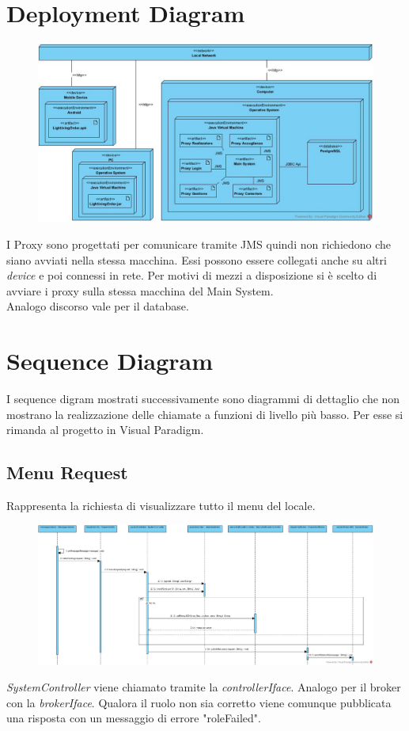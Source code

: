 \section{Deployment Diagram}
\begin{figure}[H]
	\centering
	\includegraphics[width=1\textwidth]{Immagini/deploy.jpg}
\end{figure}
I Proxy sono progettati per comunicare tramite JMS quindi non richiedono che siano avviati nella stessa macchina. Essi possono essere collegati anche su altri \textit{device} e poi connessi in rete. Per motivi di mezzi a disposizione si è scelto di avviare i proxy sulla stessa macchina del Main System.
\\Analogo discorso vale per il database.

\section{Sequence Diagram}
I sequence digram mostrati successivamente sono diagrammi di dettaglio che non mostrano la realizzazione delle chiamate a funzioni di livello più basso. Per esse si rimanda al progetto in Visual Paradigm.
\subsection{Menu Request}
Rappresenta la richiesta di visualizzare tutto il menu del locale.
 \begin{figure}[H]
 	\centering
 	\includegraphics[width=1\textwidth]{Immagini/top_menuRequest.jpg}
 \end{figure}
\textit{SystemController} viene chiamato tramite la \textit{controllerIface}. Analogo per il broker con la \textit{brokerIface}. Qualora il ruolo non sia corretto viene comunque pubblicata una risposta con un messaggio di errore "roleFailed".

